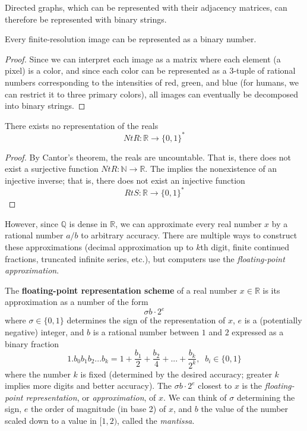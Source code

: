 \documentclass{article}
\begin{document}
  \begin{corollary}
  Directed graphs, which can be represented with their adjacency matrices, can therefore be represented with binary strings. 
  \end{corollary}

  \begin{theorem}
  Every finite-resolution image can be represented as a binary number. 
  \end{theorem}
  \begin{proof}
  Since we can interpret each image as a matrix where each element (a pixel) is a color, and since each color can be represented as a 3-tuple of rational numbers corresponding to the intensities of red, green, and blue (for humans, we can restrict it to three primary colors), all images can eventually be decomposed into binary strings. 
  \end{proof}

  \begin{theorem}
  There exists no representation of the reals
  \[NtR: \mathbb{R} \longrightarrow \{0, 1\}^*\]
  \end{theorem}
  \begin{proof}
  By Cantor's theorem, the reals are uncountable. That is, there does not exist a surjective function $NtR: \mathbb{N} \longrightarrow \mathbb{R}$. The implies the nonexistence of an injective inverse; that is, there does not exist an injective function 
  \[RtS: \mathbb{R} \longrightarrow \{0,1\}^*\]
  \end{proof}

  However, since $\mathbb{Q}$ is dense in $\mathbb{R}$, we can approximate every real number $x$ by a rational number $a/b$ to arbitrary accuracy. There are multiple ways to construct these approximations (decimal approximation up to $k$th digit, finite continued fractions, truncated infinite series, etc.), but computers use the \textit{floating-point approximation}. 

  \begin{definition}
  The \textbf{floating-point representation scheme} of a real number $x \in \mathbb{R}$ is its approximation as a number of the form 
  \[\sigma b \cdot 2^e\]
  where $\sigma \in \{0, 1\}$ determines the sign of the representation of $x$, $e$ is a (potentially negative) integer, and $b$ is a rational number between $1$ and $2$ expressed as a binary fraction 
  \[1.b_0 b_1 b_2 ... b_k = 1 + \frac{b_1}{2} + \frac{b_2}{4} + ... + \frac{b_k}{2^k}, \;\; b_i \in \{0,1\}\]
  where the number $k$ is fixed (determined by the desired accuracy; greater $k$ implies more digits and better accuracy). The $\sigma b \cdot 2^e$ closest to $x$ is the \textit{floating-point representation}, or \textit{approximation}, of $x$. We can think of $\sigma$ determining the sign, $e$ the order of magnitude (in base 2) of $x$, and $b$ the value of the number scaled down to a value in $[1,2)$, called the \textit{mantissa}. 
  \end{definition}
\end{document}
